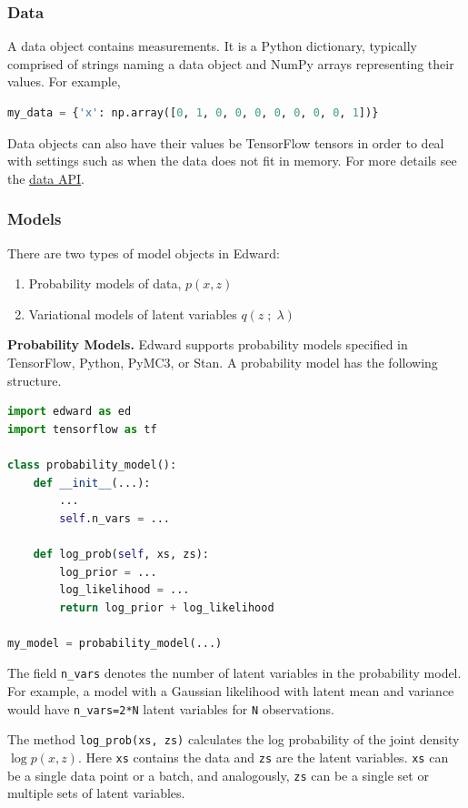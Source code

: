 \subsubsection{Data}

A data object contains measurements. It is a Python dictionary,
typically comprised of strings naming a data object and NumPy arrays
representing their values. For example,

\begin{lstlisting}[language=Python]
my_data = {'x': np.array([0, 1, 0, 0, 0, 0, 0, 0, 0, 1])}
\end{lstlisting}

Data objects can also have their values be TensorFlow tensors in order
to deal with settings such as when the data does not fit in memory.
For more details see the \href{api/data.html}{data API}.

\subsubsection{Models}\label{models}

There are two types of model objects in Edward:
\begin{enumerate}
\item Probability models of data, $p(x,z)$
\item Variational models of latent variables $q(z\;;\;\lambda)$
\end{enumerate}

\textbf{Probability Models.}
Edward supports probability models specified in TensorFlow, Python, PyMC3,
or Stan. A probability model has the following structure.
\begin{lstlisting}[language=Python]
import edward as ed
import tensorflow as tf

class probability_model():
    def __init__(...):
        ...
        self.n_vars = ...

    def log_prob(self, xs, zs):
        log_prior = ...
        log_likelihood = ...
        return log_prior + log_likelihood

my_model = probability_model(...)
\end{lstlisting}
The field \texttt{n\_vars} denotes the number of latent variables in the
probability model. For example, a model with a Gaussian likelihood with latent
mean and variance would have \texttt{n\_vars=2*N} latent variables for
\texttt{N} observations.

The method \texttt{log_prob(xs, zs)} calculates the log probability of
the joint density $\log p(x,z)$. Here \texttt{xs} contains the data
and \texttt{zs} are the latent variables. \texttt{xs} can be a single
data point or a batch, and analogously, \texttt{zs} can be a single set or
multiple sets of latent variables.

